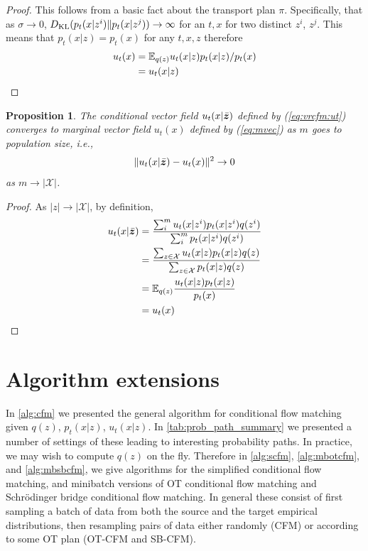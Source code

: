 \documentclass[10pt]{article}
\theoremstyle{plain}
\newtheorem{proposition}[theorem]{Proposition}
\theoremstyle{definition}
\theoremstyle{remark}
\newcommand{\ie}{\textit{i.e.}}
\begin{document}
\begin{proof}
This follows from a basic fact about the transport plan $\pi$. Specifically, that as $\sigma \to 0$, $D_{\mathrm{KL}}(p_t(x | z^i) \| p_t(x | z^j)) \to \infty$ for an $t,x$ for two distinct $z^i$, $z^j$. This means that $p_t(x | z) = p_t(x)$ for any $t,x,z$ therefore 
\begin{align*}
u_t(x) &= \mathbb{E}_{q(z)} u_t(x | z) p_t(x | z) / p_t(x) \\
&= u_t(x | z)
\end{align*}
\end{proof}

\begin{proposition}\label{vrmodels:ut}
The conditional vector field $u_t(x| \bar{{\bm{z}}})$ defined by (\ref{eq:vrcfm:ut}) converges to marginal vector field $u_t(x)$ defined by (\ref{eq:mvec}) as $m$ goes to population size, \ie,
\begin{equation*}
\|u_t(x|\bar{{\bm{z}}}) - u_t(x)\|^2\to 0
\end{equation*}
as $m \to |\mathcal{X}|$. 
\end{proposition}
\begin{proof}
As $|z|\to |\mathcal{X}|$, by definition, 
\begin{align*}
u_t(x | \bar{{\bm{z}}}) 
    &= \frac{\sum_i^m u_t(x | z^i) p_t(x | z^i) q(z^i)}{\sum_i^m p_t(x | z^i) q(z^i)}\\
    &= \frac{\sum_{z\in \mathcal{X}} u_t(x | z) p_t(x | z) q(z)}{\sum_{z\in \mathcal{X}} p_t(x | z) q(z)}\\
    &= \mathbb{E}_{q(z)} \frac{u_t(x | z) p_t(x | z)}{p_t(x)}\\
    &= u_t(x)   
\end{align*}
\end{proof}

\section{Algorithm extensions}

In \autoref{alg:cfm} we presented the general algorithm for conditional flow matching given $q(z)$, $p_t(x|z)$, $u_t(x|z)$. In \autoref{tab:prob_path_summary} we presented a number of settings of these leading to interesting probability paths. In practice, we may wish to compute $q(z)$ on the fly. Therefore in \autoref{alg:scfm}, \autoref{alg:mbotcfm}, and \autoref{alg:mbsbcfm}, we give algorithms for the simplified conditional flow matching, and minibatch versions of OT conditional flow matching and Schr\"odinger bridge conditional flow matching. In general these consist of first sampling a batch of data from both the source and the target empirical distributions, then resampling pairs of data either randomly (CFM) or according to some OT plan (OT-CFM and SB-CFM).
\end{document}
